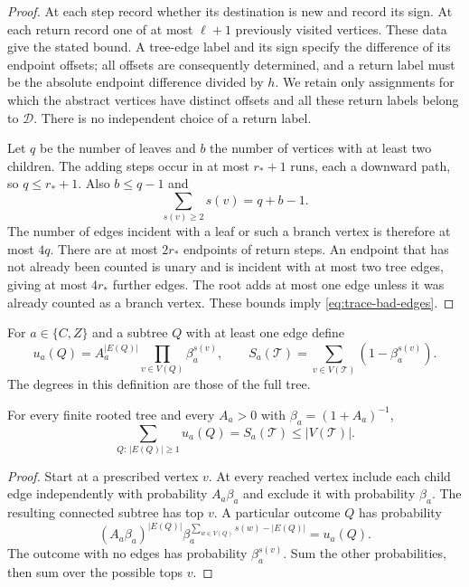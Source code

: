 \begin{proof}
At each step record whether its destination is new and record its sign.
At each return record one of at most $\ell+1$ previously visited vertices.
These data give the stated bound.  A tree-edge label and its sign specify
the difference of its endpoint offsets; all offsets are consequently
determined, and a return label must be the absolute endpoint difference
divided by $h$.  We retain only assignments for which the abstract vertices
have distinct offsets and all these return labels belong to $\mathcal D$.
There is no independent choice of a return label.

Let $q$ be the number of leaves and $b$ the number of vertices with at
least two children.  The adding steps occur in at most $r_*+1$ runs,
each a downward path, so $q\le r_*+1$.  Also $b\le q-1$ and
\[
 \sum_{s(v)\ge2}s(v)=q+b-1.
\]
The number of edges incident with a leaf or such a branch vertex is
therefore at most $4q$.  There are at most $2r_*$ endpoints of return
steps.  An endpoint that has not already been counted is unary and is
incident with at most two tree edges, giving at most $4r_*$ further
edges.  The root adds at most one edge unless it was already counted as a
branch vertex.  These bounds imply \eqref{eq:trace-bad-edges}.
\end{proof}

For $a\in\{C,Z\}$ and a subtree $Q$ with at least one edge define
\begin{equation}\label{eq:subtree-weights}
 u_a(Q)=A_a^{|E(Q)|}\prod_{v\in V(Q)}\beta_a^{s(v)},\qquad
 S_a(\mathscr T)=\sum_{v\in V(\mathscr T)}(1-\beta_a^{s(v)}).
\end{equation}
The degrees in this definition are those of the full tree.

\begin{lemma}\label{lem:subtree-weight}
For every finite rooted tree and every $A_a>0$ with
$\beta_a=(1+A_a)^{-1}$,
\begin{equation}\label{eq:subtree-identity}
 \sum_{Q:\,|E(Q)|\ge1}u_a(Q)=S_a(\mathscr T)\le |V(\mathscr T)|.
\end{equation}
\end{lemma}

\begin{proof}
Start at a prescribed vertex $v$.  At every reached vertex include each
child edge independently with probability $A_a\beta_a$ and exclude it
with probability $\beta_a$.  The resulting connected subtree has top
$v$.  A particular outcome $Q$ has probability
\[
 (A_a\beta_a)^{|E(Q)|}
 \beta_a^{\sum_{w\in V(Q)}s(w)-|E(Q)|}=u_a(Q).
\]
The outcome with no edges has probability $\beta_a^{s(v)}$.
Sum the other probabilities, then sum over the possible tops $v$.
\end{proof}

